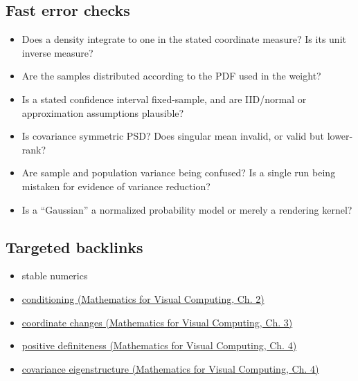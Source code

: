 \subsection{Fast error checks}\label{appendix-cb5af353ef77-fast-error-checks}

\hypertarget{appendix-cb5af353ef77-fast-error-checks}{}

\begin{itemize}
\tightlist
\item
  Does a density integrate to one in the stated coordinate measure? Is its unit inverse measure?
\item
  Are the samples distributed according to the PDF used in the weight?
\item
  Is a stated confidence interval fixed-sample, and are IID/normal or approximation assumptions plausible?
\item
  Is covariance symmetric PSD? Does singular mean invalid, or valid but lower-rank?
\item
  Are sample and population variance being confused? Is a single run being mistaken for evidence of variance reduction?
\item
  Is a ``Gaussian'' a normalized probability model or merely a rendering kernel?
\end{itemize}

\subsection{Targeted backlinks}\label{appendix-cb5af353ef77-targeted-backlinks}

\hypertarget{appendix-cb5af353ef77-targeted-backlinks}{}

\begin{itemize}
\tightlist
\item
  {stable numerics}
\item
  \href{../02-Mathematics-for-Visual-Computing/main.pdf\#nameddest=01-foundations-i-ch018-an-inverse-can-exist-and-still-amplify-uncertainty}{conditioning (Mathematics for Visual Computing, Ch. 2)}
\item
  \href{../02-Mathematics-for-Visual-Computing/main.pdf\#nameddest=01-foundations-i-ch019-coordinates-can-change-while-the-geometric-object-stays-still}{coordinate changes (Mathematics for Visual Computing, Ch. 3)}
\item
  \href{../02-Mathematics-for-Visual-Computing/main.pdf\#nameddest=01-foundations-i-ch020-positive-definiteness-is-a-structural-promise}{positive definiteness (Mathematics for Visual Computing, Ch. 4)}
\item
  \href{../02-Mathematics-for-Visual-Computing/main.pdf\#nameddest=01-foundations-i-ch020-diagonalization-leads-to-the-stronger-symmetric-spectral-theorem}{covariance eigenstructure (Mathematics for Visual Computing, Ch. 4)}
\end{itemize}

